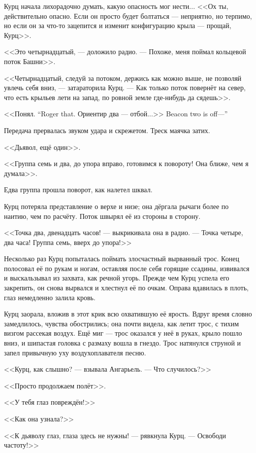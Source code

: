 Курц начала лихорадочно думать, какую опасность мог нести...
<<Ох ты, действительно опасно.
Если он просто будет болтаться --- неприятно, но терпимо, но если он за что-то зацепится и изменит конфигурацию крыла --- прощай, Курц>>.

<<Это четырнадцатый, --- доложило радио.
--- Похоже, меня поймал кольцевой поток Башни>>.

<<Четырнадцатый, следуй за потоком, держись как можно выше, не позволяй увлечь себя вниз, --- затараторила Курц.
--- Как только поток повернёт на север, что есть крыльев лети на запад, по ровной земле где-нибудь да сядешь>>.

{<<Понял.}
{``Roger that.}
{Ориентир два --- отбой...>>}
{Beacon two is off---''}

Передача прервалась звуком удара и скрежетом.
Треск маячка затих.

<<Дьявол, ещё один>>.

<<Группа семь и два, до упора вправо, готовимся к повороту!
Она ближе, чем я думала>>.

Едва группа прошла поворот, как налетел шквал.

Курц потеряла представление о верхе и низе;
она дёргала рычаги более по наитию, чем по расчёту.
Поток швырял её из стороны в сторону.

<<Точка два, двенадцать часов! --- выкрикивала она в радио.
--- Точка четыре, два часа!
Группа семь, вверх до упора!>>

Несколько раз Курц попыталась поймать злосчастный вырванный трос.
Конец полосовал её по рукам и ногам, оставляя после себя горящие ссадины, извивался и выскальзывал из захвата, как речной угорь.
Прежде чем Курц успела его закрепить, он снова вырвался и хлестнул её по очкам.
Оправа вдавилась в плоть, глаз немедленно залила кровь.

Курц заорала, вложив в этот крик всю охватившую её ярость.
Вдруг время словно замедлилось, чувства обострились;
она почти видела, как летит трос, с тихим визгом рассекая воздух.
Ещё миг --- трос оказался у неё в руках, крыло пошло вниз, и шипастая головка с размаху вошла в гнездо.
Трос натянулся струной и запел привычную уху воздухоплавателя песню.

<<Курц, как слышно? --- взывала Ангарьель.
--- Что случилось?>>

<<Просто продолжаем полёт>>.

<<У тебя глаз повреждён!>>

<<Как она узнала?>>

<<К дьяволу глаз, глаза здесь не нужны! --- рявкнула Курц.
--- Освободи частоту!>>


